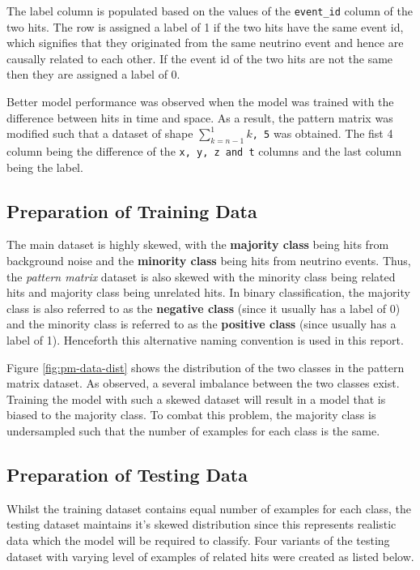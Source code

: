 The label column is populated based on the values of the
\texttt{event\_id} column of the two hits. The row is assigned a label
of 1 if the two hits have the same event id, which signifies that they
originated from the same neutrino event and hence are causally related
to each other. If the event id of the two hits are not the same then
they are assigned a label of 0.

Better model performance was observed when the model was trained with
the difference between hits in time and space. As a result, the
pattern matrix was modified such that a dataset of shape
\texttt{$\sum_{k=n-1}^{1}k$, 5} was obtained. The fist 4 column being the
difference of the \texttt{x, y, z and t} columns and the last column
being the label.

\subsection{Preparation of Training Data}
\label{sec:pm-data-prep-train}

The main dataset is highly skewed, with the \textbf{majority class}
being hits from background noise and the \textbf{minority class} being
hits from neutrino events. Thus, the \textit{pattern matrix} dataset
is also skewed with the minority class being related hits and majority
class being unrelated hits. In binary classification, the majority
class is also referred to as the \textbf{negative class} (since it
usually has a label of 0) and the minority class is referred to as the
\textbf{positive class} (since usually has a label of 1). Henceforth
this alternative naming convention is used in this report.

Figure \ref{fig:pm-data-dist} shows the distribution of the two
classes in the pattern matrix dataset. As observed, a several
imbalance between the two classes exist. Training the model with such
a skewed dataset will result in a model that is biased to the majority
class. To combat this problem, the majority class is undersampled
\cite{CITEME} such that the number of examples for each class is the
same.

\subsection{Preparation of Testing Data}
\label{sec:pm-data-prep-test}

Whilst the training dataset contains equal number of examples for each
class, the testing dataset maintains it's skewed distribution since
this represents realistic data which the model will be required to
classify. Four variants of the testing dataset with varying level of
examples of related hits were created as listed below.

